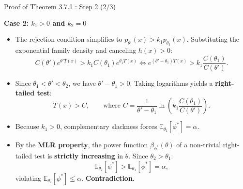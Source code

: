 \documentclass[10pt, aspectratio=169, xcolor=dvipsnames]{beamer}
\newcommand{\lead}[1]{{\color{UniBlue}\bfseries #1}}
\begin{document}
\begin{frame}{Proof of Theorem 3.7.1 : Step 2 (2/3)}
    
    \lead{Case 2: $k_1 > 0$ and $k_2 = 0$}\\
    \vspace{0.2cm}
    
    \color{Slate}
    \begin{itemize}
        \setlength\itemsep{6pt}
        \item[\textcolor{Teal}{\textbullet}] The rejection condition simplifies to $p_{\theta'}(x) > k_1 p_{\theta_1}(x)$. Substituting the exponential family density and canceling $h(x) > 0$:
        \[
            C(\theta') e^{\theta' T(x)} > k_1 C(\theta_1) e^{\theta_1 T(x)}
            \iff e^{(\theta' - \theta_1) T(x)} > k_1 \frac{C(\theta_1)}{C(\theta')}.
        \]
        
        \item[\textcolor{Teal}{\textbullet}] Since $\theta_1 < \theta' < \theta_2$, we have $\theta' - \theta_1 > 0$. Taking logarithms yields a \textbf{right-tailed test}:
        \[
            T(x) > C, \qquad \text{where } C = \frac{1}{\theta' - \theta_1} \ln\!\left(k_1 \frac{C(\theta_1)}{C(\theta')}\right).
        \]
        
        \item[\textcolor{Teal}{\textbullet}] Because $k_1 > 0$, complementary slackness forces $\mathbb{E}_{\theta_1}[\phi^*] = \alpha$.
        
        \item[\textcolor{Teal}{\textbullet}] By the \textbf{MLR property}, the power function $\beta_{\phi^*}(\theta)$ of a non-trivial right-tailed test is \textbf{strictly increasing} in $\theta$. Since $\theta_2 > \theta_1$:
        \[
            \mathbb{E}_{\theta_2}[\phi^*] > \mathbb{E}_{\theta_1}[\phi^*] = \alpha,
        \]
        violating $\mathbb{E}_{\theta_2}[\phi^*] \le \alpha$. \textbf{Contradiction.}
    \end{itemize}
\end{frame}
\end{document}
